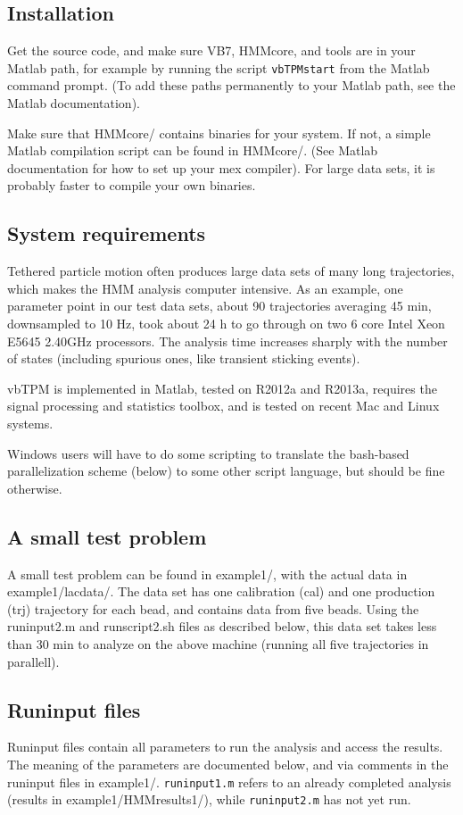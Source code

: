 \subsection{Installation}
Get the source code, and make sure VB7, HMMcore, and tools are in your
Matlab path, for example by running the script \verb+vbTPMstart+ from
the Matlab command prompt. (To add these paths permanently to your
Matlab path, see the Matlab documentation).

Make sure that HMMcore/ contains binaries for your system. If not, a
simple Matlab compilation script can be found in HMMcore/. (See Matlab
documentation for how to set up your mex compiler). For large data
sets, it is probably faster to compile your own binaries.

\subsection{System requirements}
Tethered particle motion often produces large data sets of many long
trajectories, which makes the HMM analysis computer intensive. As an
example, one parameter point in our test data sets, about 90
trajectories averaging 45 min, downsampled to 10 Hz, took about 24 h
to go through on two 6 core Intel Xeon E5645 2.40GHz processors. The
analysis time increases sharply with the number of states (including
spurious ones, like transient sticking events).

vbTPM is implemented in Matlab, tested on R2012a and R2013a, requires
the signal processing and statistics toolbox, and is tested on recent
Mac and Linux systems. 

Windows users will have to do some scripting to translate the
bash-based parallelization scheme (below) to some other script
language, but should be fine otherwise.

\subsection{A small test problem}
A small test problem can be found in example1/, with the actual data
in example1/lacdata/.  The data set has one calibration (cal) and one
production (trj) trajectory for each bead, and contains data from five
beads. Using the runinput2.m and runscript2.sh files as described
below, this data set takes less than 30 min to analyze on the above
machine (running all five trajectories in parallell).

\subsection{Runinput files} 
Runinput files contain all parameters to run the analysis and access
the results. The meaning of the parameters are documented below, and
via comments in the runinput files in example1/.  \verb+runinput1.m+
refers to an already completed analysis (results in
example1/HMMresults1/), while \verb+runinput2.m+ has not yet run.

